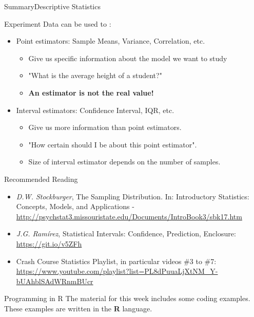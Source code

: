 \documentclass[aspectratio=169]{beamer}
\begin{document}
\begin{CJK}{UTF8}{ipxm}
\begin{frame}{Summary}{Descriptive Statistics}

  Experiment Data can be used to :
  \bigskip

  \begin{itemize}
    \item Point estimators: Sample Means, Variance, Correlation, etc.
    \begin{itemize}
      \item Give us specific information about the model we want to study
      \item "What is the average height of a student?"
      \item {\bf An estimator is not the real value!}
    \end{itemize}\bigskip

    \item Interval estimators: Confidence Interval, IQR, etc.
    \begin{itemize}
      \item Give us more information than point estimators.
      \item "How certain should I be about this point estimator".
      \item Size of interval estimator depends on the number of samples.
    \end{itemize}
  \end{itemize}
\end{frame}


\begin{frame}{Recommended Reading}
  \begin{itemize}
    \item \emph{D.W. Stockburger}, The Sampling Distribution. In: Introductory Statistics: Concepts, Models, and Applications -
    \url{http://psychstat3.missouristate.edu/Documents/IntroBook3/sbk17.htm}
    \item \emph{J.G. Ramírez}, Statistical Intervals: Confidence, Prediction, Enclosure: \url{https://git.io/v5ZFh}
    \item Crash Course Statistics Playlist, in particular videos \#3 to \#7: \url{https://www.youtube.com/playlist?list=PL8dPuuaLjXtNM_Y-bUAhblSAdWRnmBUcr}
  \end{itemize}
\end{frame}

\begin{frame}{Programming in R}
  The material for this week includes some coding examples. These examples are
  written in the {\bf R} language.\bigskip


\end{frame}
\end{CJK}
\end{document}
